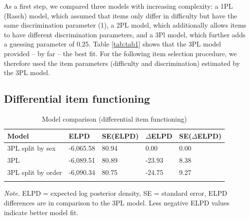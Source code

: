 \documentclass[
  man,floatsintext]{apa6}
\begin{document}
As a first step, we compared three models with increasing complexity: a 1PL (Rasch) model, which assumed that items only differ in difficulty but have the same discrimination parameter (1), a 2PL model, which additionally allows items to have different discrimination parameters, and a 3Pl model, which further adds a guessing parameter of 0.25. Table \ref{tab:tab1} shows that the 3PL model provided -- by far -- the best fit. For the following item selection procedure, we therefore used the item parameters (difficulty and discrimination) estimated by the 3PL model.

\hypertarget{differential-item-functioning}{%
\subsection{Differential item functioning}\label{differential-item-functioning}}

\begin{table}[tbp]

\begin{center}
\begin{threeparttable}

\caption{\label{tab:tab2}Model comparison (differential item functioning)}

\begin{tabular}{lllll}
\toprule
Model & ELPD & SE(ELPD) & $\Delta$ELPD & SE($\Delta$ELPD)\\
\midrule
3PL split by sex & -6,065.58 & 80.94 & 0.00 & 0.00\\
3PL & -6,089.51 & 80.89 & -23.93 & 8.38\\
3PL split by order & -6,090.34 & 80.75 & -24.75 & 9.27\\
\bottomrule
\addlinespace
\end{tabular}

\begin{tablenotes}[para]
\normalsize{\textit{Note.} ELPD = expected log posterior density, SE = standard error, ELPD differences are in comparison to the 3PL model. Less negative ELPD values indicate better model fit.}
\end{tablenotes}

\end{threeparttable}
\end{center}

\end{table}
\end{document}
